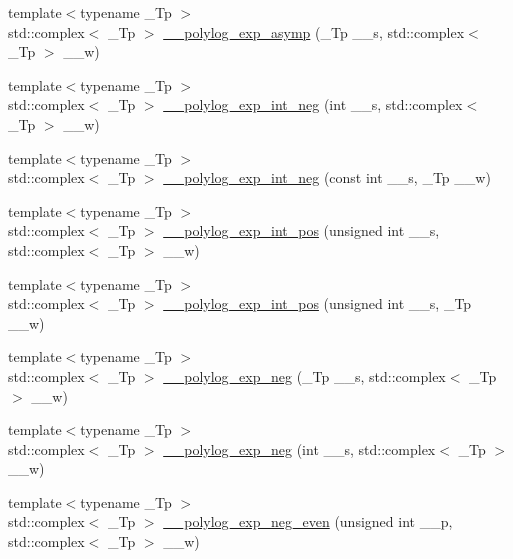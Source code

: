 \begin{DoxyCompactItemize}
\item 
{\footnotesize template$<$typename \+\_\+\+Tp $>$ }\\std\+::complex$<$ \+\_\+\+Tp $>$ \hyperlink{namespacestd_1_1____detail_af3684fc449da490e9a43985245618a90}{\+\_\+\+\_\+polylog\+\_\+exp\+\_\+asymp} (\+\_\+\+Tp \+\_\+\+\_\+s, std\+::complex$<$ \+\_\+\+Tp $>$ \+\_\+\+\_\+w)
\item 
{\footnotesize template$<$typename \+\_\+\+Tp $>$ }\\std\+::complex$<$ \+\_\+\+Tp $>$ \hyperlink{namespacestd_1_1____detail_a0857fa498441a0b3a6bf9e2d91cb6e86}{\+\_\+\+\_\+polylog\+\_\+exp\+\_\+int\+\_\+neg} (int \+\_\+\+\_\+s, std\+::complex$<$ \+\_\+\+Tp $>$ \+\_\+\+\_\+w)
\item 
{\footnotesize template$<$typename \+\_\+\+Tp $>$ }\\std\+::complex$<$ \+\_\+\+Tp $>$ \hyperlink{namespacestd_1_1____detail_a7d1d29f2a53007e83c70e9ef805d0ffa}{\+\_\+\+\_\+polylog\+\_\+exp\+\_\+int\+\_\+neg} (const int \+\_\+\+\_\+s, \+\_\+\+Tp \+\_\+\+\_\+w)
\item 
{\footnotesize template$<$typename \+\_\+\+Tp $>$ }\\std\+::complex$<$ \+\_\+\+Tp $>$ \hyperlink{namespacestd_1_1____detail_ade6f4296cf73408cb7e4e3efa58610e2}{\+\_\+\+\_\+polylog\+\_\+exp\+\_\+int\+\_\+pos} (unsigned int \+\_\+\+\_\+s, std\+::complex$<$ \+\_\+\+Tp $>$ \+\_\+\+\_\+w)
\item 
{\footnotesize template$<$typename \+\_\+\+Tp $>$ }\\std\+::complex$<$ \+\_\+\+Tp $>$ \hyperlink{namespacestd_1_1____detail_a4915187dda5bbc8f089cfbbe6867f984}{\+\_\+\+\_\+polylog\+\_\+exp\+\_\+int\+\_\+pos} (unsigned int \+\_\+\+\_\+s, \+\_\+\+Tp \+\_\+\+\_\+w)
\item 
{\footnotesize template$<$typename \+\_\+\+Tp $>$ }\\std\+::complex$<$ \+\_\+\+Tp $>$ \hyperlink{namespacestd_1_1____detail_a07b26b8c7ff467310e4e1df6e3efd893}{\+\_\+\+\_\+polylog\+\_\+exp\+\_\+neg} (\+\_\+\+Tp \+\_\+\+\_\+s, std\+::complex$<$ \+\_\+\+Tp $>$ \+\_\+\+\_\+w)
\item 
{\footnotesize template$<$typename \+\_\+\+Tp $>$ }\\std\+::complex$<$ \+\_\+\+Tp $>$ \hyperlink{namespacestd_1_1____detail_aac54584aa89fef6a08a258ad6e2a75f5}{\+\_\+\+\_\+polylog\+\_\+exp\+\_\+neg} (int \+\_\+\+\_\+s, std\+::complex$<$ \+\_\+\+Tp $>$ \+\_\+\+\_\+w)
\item 
{\footnotesize template$<$typename \+\_\+\+Tp $>$ }\\std\+::complex$<$ \+\_\+\+Tp $>$ \hyperlink{namespacestd_1_1____detail_ae3d307403fdecf2bd7475e3d3b2b8f9d}{\+\_\+\+\_\+polylog\+\_\+exp\+\_\+neg\+\_\+even} (unsigned int \+\_\+\+\_\+p, std\+::complex$<$ \+\_\+\+Tp $>$ \+\_\+\+\_\+w)

\end{DoxyCompactItemize}

